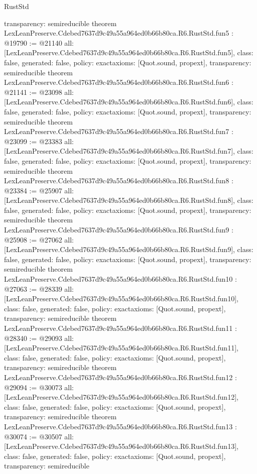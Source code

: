 \begin{lexlean}{RustStd}
\begin{coremodule}
{  transparency: semireducible
}
theorem LexLeanPreserve.Cdebed7637d9c49a55a964ed0b66b80ca.R6.RustStd.fun5 : @19790 := @21140 {
  all: [LexLeanPreserve.Cdebed7637d9c49a55a964ed0b66b80ca.R6.RustStd.fun5],
  class: false,
  generated: false,
  policy: exact{axioms: [Quot.sound, propext]},
  transparency: semireducible
}
theorem LexLeanPreserve.Cdebed7637d9c49a55a964ed0b66b80ca.R6.RustStd.fun6 : @21141 := @23098 {
  all: [LexLeanPreserve.Cdebed7637d9c49a55a964ed0b66b80ca.R6.RustStd.fun6],
  class: false,
  generated: false,
  policy: exact{axioms: [Quot.sound, propext]},
  transparency: semireducible
}
theorem LexLeanPreserve.Cdebed7637d9c49a55a964ed0b66b80ca.R6.RustStd.fun7 : @23099 := @23383 {
  all: [LexLeanPreserve.Cdebed7637d9c49a55a964ed0b66b80ca.R6.RustStd.fun7],
  class: false,
  generated: false,
  policy: exact{axioms: [Quot.sound, propext]},
  transparency: semireducible
}
theorem LexLeanPreserve.Cdebed7637d9c49a55a964ed0b66b80ca.R6.RustStd.fun8 : @23384 := @25907 {
  all: [LexLeanPreserve.Cdebed7637d9c49a55a964ed0b66b80ca.R6.RustStd.fun8],
  class: false,
  generated: false,
  policy: exact{axioms: [Quot.sound, propext]},
  transparency: semireducible
}
theorem LexLeanPreserve.Cdebed7637d9c49a55a964ed0b66b80ca.R6.RustStd.fun9 : @25908 := @27062 {
  all: [LexLeanPreserve.Cdebed7637d9c49a55a964ed0b66b80ca.R6.RustStd.fun9],
  class: false,
  generated: false,
  policy: exact{axioms: [Quot.sound, propext]},
  transparency: semireducible
}
theorem LexLeanPreserve.Cdebed7637d9c49a55a964ed0b66b80ca.R6.RustStd.fun10 : @27063 := @28339 {
  all: [LexLeanPreserve.Cdebed7637d9c49a55a964ed0b66b80ca.R6.RustStd.fun10],
  class: false,
  generated: false,
  policy: exact{axioms: [Quot.sound, propext]},
  transparency: semireducible
}
theorem LexLeanPreserve.Cdebed7637d9c49a55a964ed0b66b80ca.R6.RustStd.fun11 : @28340 := @29093 {
  all: [LexLeanPreserve.Cdebed7637d9c49a55a964ed0b66b80ca.R6.RustStd.fun11],
  class: false,
  generated: false,
  policy: exact{axioms: [Quot.sound, propext]},
  transparency: semireducible
}
theorem LexLeanPreserve.Cdebed7637d9c49a55a964ed0b66b80ca.R6.RustStd.fun12 : @29094 := @30073 {
  all: [LexLeanPreserve.Cdebed7637d9c49a55a964ed0b66b80ca.R6.RustStd.fun12],
  class: false,
  generated: false,
  policy: exact{axioms: [Quot.sound, propext]},
  transparency: semireducible
}
theorem LexLeanPreserve.Cdebed7637d9c49a55a964ed0b66b80ca.R6.RustStd.fun13 : @30074 := @30507 {
  all: [LexLeanPreserve.Cdebed7637d9c49a55a964ed0b66b80ca.R6.RustStd.fun13],
  class: false,
  generated: false,
  policy: exact{axioms: [Quot.sound, propext]},
  transparency: semireducible
}
\end{coremodule}
\end{lexlean}
